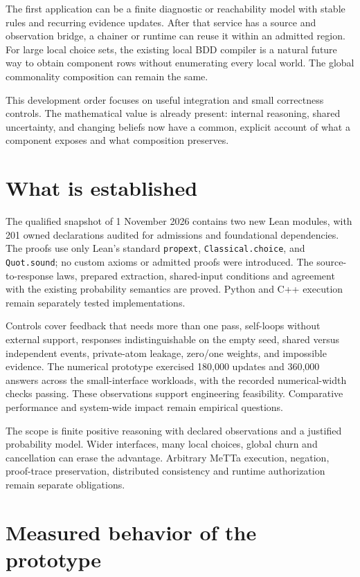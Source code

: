 \documentclass[11pt,a4paper]{article}
\newcommand{\code}[1]{\nolinkurl{#1}}
\begin{document}
The first application can be a finite diagnostic or reachability model with
stable rules and recurring evidence updates. After that service has a source
and observation bridge, a chainer or runtime can reuse it within an admitted
region. For large local choice sets, the existing local BDD compiler is a
natural future way to obtain component rows without enumerating every local
world. The global commonality composition can remain the same.

This development order focuses on useful integration and small correctness
controls. The mathematical value is already present: internal reasoning,
shared uncertainty, and changing beliefs now have a common, explicit account
of what a component exposes and what composition preserves.

\section{What is established}

The qualified snapshot of 1 November 2026 contains two new Lean modules,
with 201 owned declarations audited for admissions and foundational
dependencies. The proofs use only Lean's standard \code{propext},
\code{Classical.choice}, and \code{Quot.sound}; no custom axioms or admitted
proofs were introduced. The source-to-response laws, prepared extraction,
shared-input conditions and agreement with the existing probability semantics
are proved. Python and C++ execution remain separately tested implementations.

Controls cover feedback that needs more than one pass, self-loops without external support,
responses indistinguishable on the empty seed, shared versus independent
events, private-atom leakage, zero/one weights, and impossible evidence.
The numerical prototype exercised 180,000 updates and 360,000 answers across
the small-interface workloads, with the recorded numerical-width checks
passing. These observations support engineering feasibility. Comparative
performance and system-wide impact remain empirical questions.

The scope is finite positive reasoning with declared observations and a
justified probability model. Wider interfaces, many local choices, global
churn and cancellation can erase the advantage. Arbitrary MeTTa execution,
negation, proof-trace preservation, distributed consistency and runtime
authorization remain separate obligations.

\clearpage
\section{Measured behavior of the prototype}
\end{document}
